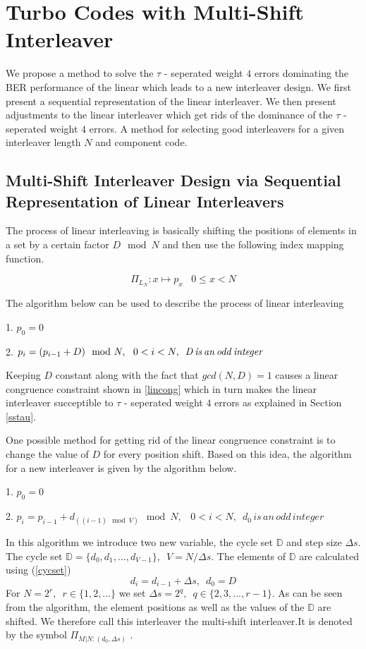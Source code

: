\documentclass[a4paper, 12pt, oneside, openary]{jbook}
\begin{document}
 \section{Turbo Codes with Multi-Shift Interleaver}
 We propose a method to solve the  $\tau$ - seperated weight $4$ errors dominating the BER performance of the linear which leads to a new interleaver design. We first present a sequential representation of the linear interleaver. We then present adjustments to the linear interleaver which get rids of the dominance of the $\tau$ - seperated weight $4$ errors. A method for selecting good interleavers for a given interleaver length $N$ and component code.
 
 \subsection{Multi-Shift Interleaver Design via Sequential Representation of Linear Interleavers}
 The process of linear interleaving is basically shifting the positions of elements in
 a set by a certain factor $D \mod N$ and then use the following index mapping function.
 
 $$\Pi_{\mathit{L}_{N}} : x \mapsto p_x\,\,\,\,\, 0\leq x<N$$
 
 The algorithm below can be used to describe the process of linear interleaving
  
   1. $p_0=0$
 
  2. $p_i=(p_{i-1}+D) \mod N,\,\,\,\,\, \\0<i<N,\,\,\, \mathit{D \,is \,an \,odd \,integer}$
 
 
 Keeping $D$ constant along with the fact that $gcd(N,D)=1$ causes a linear congruence
  constraint shown in \ref{lincong} which in turn makes the
  linear interleaver succeptible to $\tau$ - seperated weight $4$ errors as explained in 
  Section \ref{sstau}.
 
  One possible method for getting rid of the linear congruence constraint is to change the value of $D$ for every position shift. Based on this idea, the algorithm for a new interleaver is given by the algorithm below. 
  
   1. $p_0=0$
 
 2. $p_i=p_{i-1}+d_{((i-1) \mod V) } \mod N,\,\,\,\,\, 0<i<N,\,\,\, \mathit{d_0 \,is \,an \,odd \,integer}$
  
  In this algorithm we introduce two new variable, the cycle set $\mathbb{D}$ and step size $\Delta s$. 
  The cycle set $\mathbb{D}=\{d_0,d_1,...,d_{V-1}\},\,\,\, V=N/\Delta s$. The elements of $\mathbb{D}$ are calculated using (\ref{cycset})
  \begin{equation}
  d_i=d_{i-1}+\Delta s, \,\,\, d_0=D
  \label{cycset}
  \end{equation}
 For $N=2^r, \,\,\, r\in \{1,2,...\}$ we set $\Delta s = 2^q, \,\,\, q \in \{2,3,...,r-1\}$. As can be seen from the algorithm, the element positions as well as the values of the $\mathbb{D}$ are shifted. We therefore call this interleaver the multi-shift interleaver.It is denoted by the symbol $\Pi_{\mathit{M}|{N:(d_0,\Delta s)}}$ .
 
\end{document}
